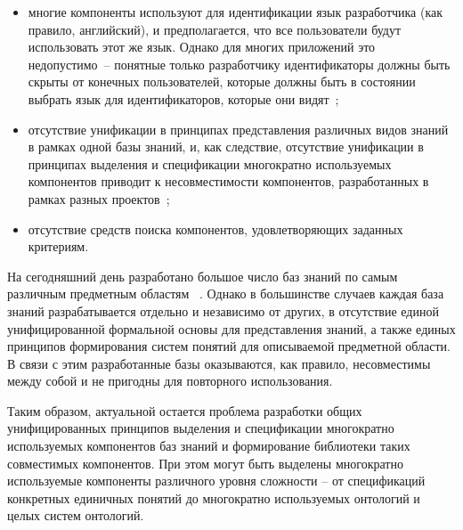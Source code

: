 \begin{itemize}
    \item многие компоненты используют для идентификации язык разработчика (как правило, английский), и предполагается, что все пользователи будут использовать этот же язык. Однако для многих приложений это \mbox{недопустимо –} понятные только разработчику идентификаторы должны быть скрыты от конечных пользователей, которые должны быть в состоянии выбрать язык для идентификаторов, которые они видят~\cite{Bolotova2012};
    \item отсутствие унификации в принципах представления различных видов знаний в рамках одной базы знаний, и, как следствие, отсутствие унификации в принципах выделения и спецификации многократно используемых компонентов приводит к несовместимости компонентов, разработанных в рамках разных проектов~\cite{Gribova2016};
    \item отсутствие средств поиска компонентов, удовлетворяющих заданных критериям.
\end{itemize}

На сегодняшний день разработано большое число баз знаний по самым различным предметным областям ~\cite{Bergman2016}. Однако в большинстве случаев каждая база знаний разрабатывается отдельно и независимо от других, в отсутствие единой унифицированной формальной основы для представления знаний, а также единых принципов формирования систем понятий для описываемой предметной области. В связи с этим разработанные базы оказываются, как правило, несовместимы между собой и не пригодны для повторного использования.

Таким образом, актуальной остается проблема разработки общих унифицированных принципов выделения и спецификации многократно используемых компонентов баз знаний и формирование библиотеки таких совместимых компонентов. При этом могут быть выделены многократно используемые компоненты различного уровня сложности -- от спецификаций конкретных единичных понятий до многократно используемых онтологий и целых систем онтологий.